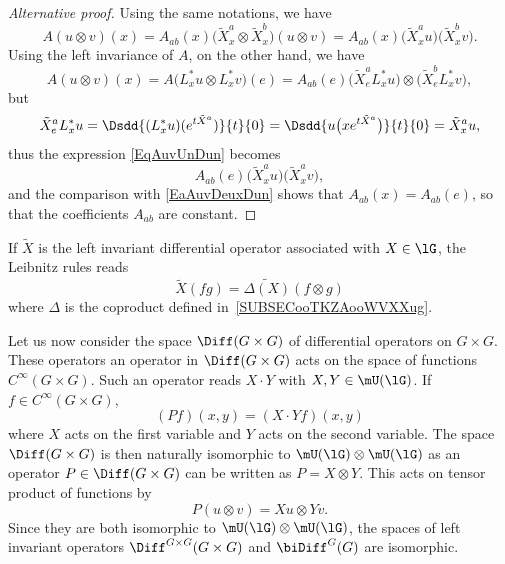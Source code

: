 \begin{proof}[Alternative proof]
	Using the same notations, we have
	\begin{equation}		\label{EaAuvDeuxDun}
		A(u\otimes v)(x)=A_{ab}(x)\big( \tilde X^a_x\otimes\tilde X^b_x \big)(u\otimes v)=A_{ab}(x)\big( \tilde X^a_xu \big)\big( \tilde X^b_xv \big).
	\end{equation}
	Using the left invariance of $A$, on the other hand, we have
	\begin{equation}		\label{EqAuvUnDun}
		A(u\otimes v)(x)=A\big( L^*_xu\otimes L^*_xv \big)(e)=A_{ab}(e)\big( \tilde X^a_eL^*_xu \big)\otimes\big( \tilde X^b_eL^*_xv \big),
	\end{equation}
	but
	\begin{equation}
		\tilde X^a_eL^*_xu=\Dsdd{ (L^*_xu)( e^{t\tilde X^a}) }{t}{0}=\Dsdd{ u\big( x e^{t\tilde X^a} \big) }{t}{0}=\tilde X^a_xu,
	\end{equation}
	thus the expression \eqref{EqAuvUnDun} becomes
	\begin{equation}
		A_{ab}(e)\big( \tilde X^a_xu \big)\big( \tilde X^a_xv \big),
	\end{equation}
	and the comparison with \eqref{EaAuvDeuxDun} shows that $A_{ab}(x)=A_{ab}(e)$, so that the coefficients $A_{ab}$ are constant.
\end{proof}

\begin{remark}  \label{REMooGIFYooTphiex}
	If $\tilde X$ is the left invariant differential operator associated with $X\in\lG$, the Leibnitz rules reads
	\begin{equation}		\label{EqXfgDeltaUnif}
		\tilde X(fg)=\widetilde{\Delta(X)}(f\otimes g)
	\end{equation}
	where \( \Delta\) is the coproduct defined in~\ref{SUBSECooTKZAooWVXXug}.
\end{remark}

Let us now consider the space $\Diff(G\times G)$ of differential operators on $G\times G$. These operators an operator in $\Diff(G\times G)$ acts on the space of functions $ C^{\infty}(G\times G)$. Such an operator reads $X\cdot Y$ with $X,Y\in\mU(\lG)$. If $f\in C^{\infty}(G\times G)$,
\begin{equation}
	(Pf)(x,y)=(X\cdot Y f)(x,y)
\end{equation}
where $X$ acts on the first variable and $Y$ acts on the second variable. The space $\Diff(G\times G)$ is then naturally isomorphic to $\mU(\lG)\otimes \mU(\lG)$ as an operator $P\in\Diff(G\times G)$ can be written as $P=X\otimes Y$. This acts on tensor product of functions by
\begin{equation}
	P(u\otimes v)=Xu\otimes Yv.
\end{equation}
Since they are both isomorphic to $\mU(\lG)\otimes\mU(\lG)$, the spaces of left invariant operators $\Diff^{G\times G}(G\times G)$ and $\biDiff^G(G)$ are isomorphic.

